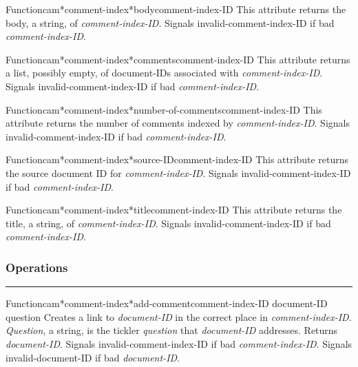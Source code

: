 \begin{functiondoc}{Function}{cam*comment-index*body}{comment-index-ID}
This attribute returns the body, a string, of {\em comment-index-ID}.
Signals invalid-comment-index-ID if bad {\em comment-index-ID}.
\end{functiondoc}

\begin{functiondoc}{Function}{cam*comment-index*comments}{comment-index-ID}
This attribute returns a list, possibly empty, of document-IDs associated 
with {\em comment-index-ID}.
Signals invalid-comment-index-ID if bad {\em comment-index-ID}.
\end{functiondoc}

\begin{functiondoc}{Function}{cam*comment-index*number-of-comments}{comment-index-ID}
This attribute returns the number of comments indexed by {\em comment-index-ID}.
Signals invalid-comment-index-ID if bad {\em comment-index-ID}.
\end{functiondoc}

\begin{functiondoc}{Function}{cam*comment-index*source-ID}{comment-index-ID}
This attribute returns the source document ID for {\em comment-index-ID}.
Signals invalid-comment-index-ID if bad {\em comment-index-ID}.
\end{functiondoc}

\begin{functiondoc}{Function}{cam*comment-index*title}{comment-index-ID}
This attribute returns the title, a string, of {\em comment-index-ID}.
Signals invalid-comment-index-ID if bad {\em comment-index-ID}.
\end{functiondoc}


\subsubsection*{Operations}
\par\vspace*{0.00in}\par\hrule\par\medskip\par


\begin{functiondoc}{Function}{cam*comment-index*add-comment}{comment-index-ID document-ID question}
Creates a link to {\em document-ID} in the correct place in {\em comment-index-ID}.
{\em Question}, a string, is the tickler {\em question} that {\em document-ID} addresses.
Returns {\em document-ID}.
Signals invalid-comment-index-ID if bad {\em comment-index-ID}.
Signals invalid-document-ID if bad {\em document-ID}.
\end{functiondoc}

